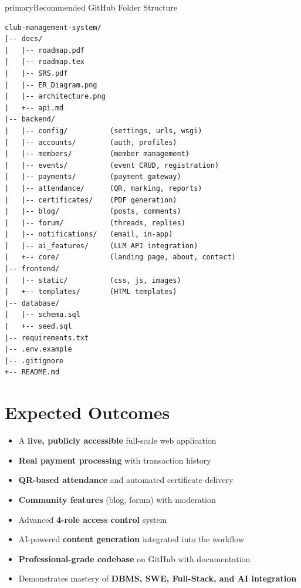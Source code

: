 \documentclass[12pt,a4paper]{article}
\begin{document}
\begin{infobox}{primary}{Recommended GitHub Folder Structure}
\begin{verbatim}
club-management-system/
|-- docs/
|   |-- roadmap.pdf
|   |-- roadmap.tex
|   |-- SRS.pdf
|   |-- ER_Diagram.png
|   |-- architecture.png
|   +-- api.md
|-- backend/
|   |-- config/          (settings, urls, wsgi)
|   |-- accounts/        (auth, profiles)
|   |-- members/         (member management)
|   |-- events/          (event CRUD, registration)
|   |-- payments/        (payment gateway)
|   |-- attendance/      (QR, marking, reports)
|   |-- certificates/    (PDF generation)
|   |-- blog/            (posts, comments)
|   |-- forum/           (threads, replies)
|   |-- notifications/   (email, in-app)
|   |-- ai_features/     (LLM API integration)
|   +-- core/            (landing page, about, contact)
|-- frontend/
|   |-- static/          (css, js, images)
|   +-- templates/       (HTML templates)
|-- database/
|   |-- schema.sql
|   +-- seed.sql
|-- requirements.txt
|-- .env.example
|-- .gitignore
+-- README.md
\end{verbatim}
\end{infobox}

\section{Expected Outcomes}

\begin{itemize}[leftmargin=*, itemsep=5pt]
  \item A \textbf{live, publicly accessible} full-scale web application
  \item \textbf{Real payment processing} with transaction history
  \item \textbf{QR-based attendance} and automated certificate delivery
  \item \textbf{Community features} (blog, forum) with moderation
  \item Advanced \textbf{4-role access control} system
  \item AI-powered \textbf{content generation} integrated into the workflow
  \item \textbf{Professional-grade codebase} on GitHub with documentation
  \item Demonstrates mastery of \textbf{DBMS, SWE, Full-Stack, and AI integration}
\end{itemize}
\end{document}
